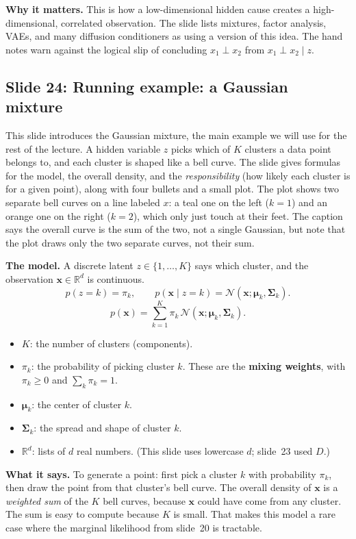 \textbf{Why it matters.} This is how a low-dimensional hidden cause creates a high-dimensional, correlated observation. The slide lists mixtures, factor analysis, VAEs, and many diffusion conditioners as using a version of this idea. The hand notes warn against the logical slip of concluding $x_1\perp x_2$ from $x_1\perp x_2\mid z$.

\subsection*{Slide 24: Running example: a Gaussian mixture}

This slide introduces the Gaussian mixture, the main example we will use for the rest of the lecture. A hidden variable $z$ picks which of $K$ clusters a data point belongs to, and each cluster is shaped like a bell curve. The slide gives formulas for the model, the overall density, and the \textit{responsibility} (how likely each cluster is for a given point), along with four bullets and a small plot. The plot shows two separate bell curves on a line labeled $x$: a teal one on the left ($k=1$) and an orange one on the right ($k=2$), which only just touch at their feet. The caption says the overall curve is the sum of the two, not a single Gaussian, but note that the plot draws only the two separate curves, not their sum.

\textbf{The model.} A discrete latent $z\in\{1,\dots,K\}$ says which cluster, and the observation $\mathbf{x}\in\mathbb{R}^d$ is continuous.
\[
p(z=k)=\pi_k,\qquad p(\mathbf{x}\mid z=k)=\mathcal{N}(\mathbf{x};\boldsymbol{\mu}_k,\boldsymbol{\Sigma}_k).
\]
\[
p(\mathbf{x})=\sum_{k=1}^{K}\pi_k\,\mathcal{N}(\mathbf{x};\boldsymbol{\mu}_k,\boldsymbol{\Sigma}_k).
\]
\begin{itemize}
\item $K$: the number of clusters (components).
\item $\pi_k$: the probability of picking cluster $k$. These are the \textbf{mixing weights}, with $\pi_k\ge0$ and $\sum_k\pi_k=1$.
\item $\boldsymbol{\mu}_k$: the center of cluster $k$.
\item $\boldsymbol{\Sigma}_k$: the spread and shape of cluster $k$.
\item $\mathbb{R}^d$: lists of $d$ real numbers. (This slide uses lowercase $d$; slide~23 used $D$.)
\end{itemize}
\textbf{What it says.} To generate a point: first pick a cluster $k$ with probability $\pi_k$, then draw the point from that cluster's bell curve. The overall density of $\mathbf{x}$ is a \textit{weighted sum} of the $K$ bell curves, because $\mathbf{x}$ could have come from any cluster. The sum is easy to compute because $K$ is small. That makes this model a rare case where the marginal likelihood from slide~20 is tractable.

